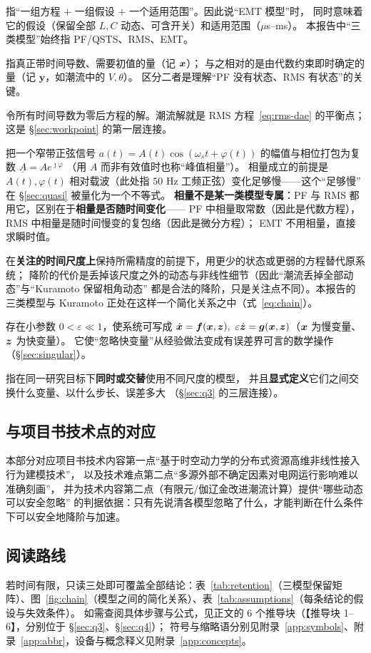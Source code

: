 \begin{description}[leftmargin=2.4em]
\item[模型] 指“一组方程 $+$ 一组假设 $+$ 一个适用范围”。因此说“EMT 模型”时，
同时意味着它的假设（保留全部 $L,C$ 动态、可含开关）和适用范围（$\mu$s--ms）。
本报告中“三类模型”始终指 PF/QSTS、RMS、EMT。
\item[状态变量] 指真正带时间导数、需要初值的量（记 $\bm{x}$）；
与之相对的是由代数约束即时确定的量（记 $\bm{y}$，如潮流中的 $V,\theta$）。
区分二者是理解“PF 没有状态、RMS 有状态”的关键。
\item[平衡点（工作点）] 令所有时间导数为零后方程的解。潮流解就是
RMS 方程~\eqref{eq:rms-dae} 的平衡点；这是 \S\ref{sec:workpoint} 的第一层连接。
\item[相量] 把一个窄带正弦信号 $a(t)=A(t)\cos(\omega_s t+\varphi(t))$
的幅值与相位打包为复数 $\underline{A}=A e^{\jmath\varphi}$
（用 $A$ 而非有效值时也称“峰值相量”）。
相量成立的前提是 $A(t),\varphi(t)$ 相对载波（此处指 $50$ Hz 工频正弦）变化足够慢——这个“足够慢”
在 \S\ref{sec:quasi} 被量化为一个不等式。
\textbf{相量不是某一类模型专属}：PF 与 RMS 都用它，区别在于\textbf{相量是否随时间变化}——
PF 中相量取常数（因此是代数方程），RMS 中相量是随时间慢变的复包络（因此是微分方程）；
EMT 不用相量，直接求瞬时值。
\item[降阶] 在\textbf{关注的时间尺度上}保持所需精度的前提下，用更少的状态或更弱的方程替代原系统；
降阶的代价是丢掉该尺度之外的动态与非线性细节（因此“潮流丢掉全部动态”与“Kuramoto 保留相角动态”
都是合法的降阶，只是关注点不同）。本报告的三类模型与 Kuramoto 正处在这样一个简化关系之中（式~\eqref{eq:chain}）。
\item[时间尺度分离] 存在小参数 $0<\varepsilon\ll1$，使系统可写成
$\dot\bx=\bm f(\bx,\bz),\ \varepsilon\dot\bz=\bm g(\bx,\bz)$（$\bm{x}$ 为慢变量、$\bm{z}$ 为快变量）。
它使“忽略快变量”从经验做法变成有误差界可言的数学操作（\S\ref{sec:singular}）。
\item[多尺度建模] 指在同一研究目标下\textbf{同时或交替}使用不同尺度的模型，
并且\textbf{显式定义}它们之间交换什么变量、以什么步长、误差多大
（\S\ref{sec:q3} 的三层连接）。
\end{description}

\subsection{与项目书技术点的对应}

本部分对应项目书技术内容第一点“基于时空动力学的分布式资源高维非线性接入行为建模技术”，
以及技术难点第二点“多源外部不确定因素对电网运行影响难以准确刻画”，
并为技术内容第二点（有限元/伽辽金改进潮流计算）提供“哪些动态可以安全忽略”
的判据依据：只有先说清各模型忽略了什么，才能判断在什么条件下可以安全地降阶与加速。

\subsection{阅读路线}

若时间有限，只读三处即可覆盖全部结论：表~\ref{tab:retention}（三模型保留矩阵）、图~\ref{fig:chain}（模型之间的简化关系）、表~\ref{tab:assumptions}（每条结论的假设与失效条件）。
如需查阅具体步骤与公式，见正文的 6 个推导块（【推导块 1--6】，分别位于 \S\ref{sec:q3}、\S\ref{sec:q4}）；
符号与缩略语分别见附录~\ref{app:symbols}、附录~\ref{app:abbr}，设备与概念释义见附录~\ref{app:concepts}。
